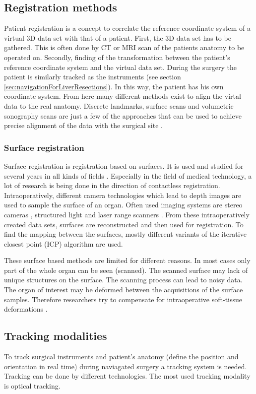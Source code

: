\subsection{Registration methods}
Patient registration is a concept to correlate the reference coordinate system
of a virtual 3D data set with that of a patient. First, the 3D data set has to
be gathered. This is often done by CT or MRI scan of the patients anatomy to be
operated on. Secondly, finding of the transformation between the patient's
reference coordinate system and the virtual data set. During the surgery the patient is similarly
tracked as the instruments (see section \ref{sec:navigationForLiverResections}).
In this way, the patient has his own coordinate system. From here many different
methods exist to align the virtal data to the real anatomy.
Discrete landmarks, surface scans and
volumetric sonography scans are just a few of the approaches that can be
used to achieve precise alignment of the data with the
surgical site \cite{banz2016intraoperative}. 

\subsubsection{Surface registration}
Surface registration is registration based on surfaces. It is used and studied
for several years in all kinds of fields \cite{ramos2015review}. Especially in
the field of medical technology, a lot of research is being done in the
direction of contactless registration. Intraoperatively, different camera technologies which lead
to depth images are used to sample the surface of an organ. Often used imaging systems are stereo cameras
\cite{furukawa2010accurate}, structured light \cite{salvi2004pattern} and
laser range scanners \cite{cash2003incorporation}. From these intraoperatively
created data sets, surfaces are reconstructed and then used for registration. To
find the mapping between the surfaces, mostly different variants of the iterative
closest point (ICP) \cite{besl1992method} algorithm are used. 

These surface based methods are limited for different reasons. In most cases
only part of the whole organ can be seen (scanned). The scanned surface may lack
of unique structures on the surface. The scanning process can 
lead to noisy data. The organ of interest may be deformed between the
acquisitions of the surface samples. Therefore researchers try to compensate for
intraoperative soft-tissue deformations \cite{cash2005compensating}\cite{dagon2008real}.
\subsection{Tracking modalities}
To track surgical instruments and patient's anatomy (define the position and
orientation in real time) during naviagated surgery a tracking system is needed.
Tracking can be done by different technologies. The most used tracking
modality is optical tracking. 

